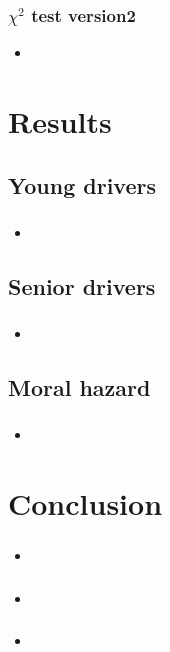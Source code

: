 \documentclass[dvipdfmx, 12pt]{beamer}
\begin{document}
\begin{frame}\frametitle{$\chi^2$ test version2}
	\begin{itemize}
	\item 
	\end{itemize}
\end{frame}


\section{Results}
\subsection{Young drivers}
\begin{frame}\frametitle{}
	\begin{itemize}
	\item 
	\end{itemize}
\end{frame}

\subsection{Senior drivers}
\begin{frame}\frametitle{}
	\begin{itemize}
	\item 
	\end{itemize}
\end{frame}

\subsection{Moral hazard}
\begin{frame}\frametitle{}
	\begin{itemize}
	\item 
	\end{itemize}
\end{frame}


\section{Conclusion}
\begin{frame}\frametitle{}
	\begin{itemize}
	\item 
	\end{itemize}
\end{frame}

\begin{frame}\frametitle{}
	\begin{itemize}
	\item 
	\end{itemize}
\end{frame}

\begin{frame}\frametitle{}
	\begin{itemize}
	\item 
	\end{itemize}
\end{frame}
\end{document}
